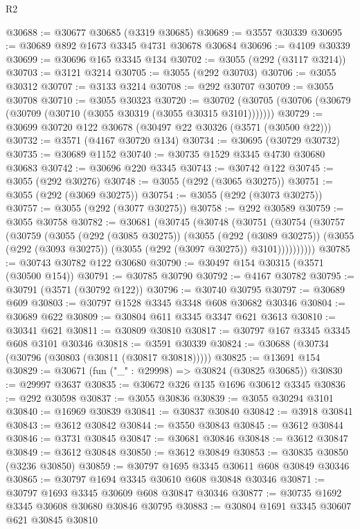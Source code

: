 \begin{lexlean}{R2}
\begin{coremodule}
@30688 := @30677 @30685 (@3319 @30685)
@30689 := @3557 @30339
@30695 := @30689 @892 @1673 @3345 @4731 @30678 @30684
@30696 := @4109 @30339
@30699 := @30696 @165 @3345 @134
@30702 := @3055 (@292 (@3117 @3214))
@30703 := @3121 @3214
@30705 := @3055 (@292 @30703)
@30706 := @3055 @30312
@30707 := @3133 @3214
@30708 := @292 @30707
@30709 := @3055 @30708
@30710 := @3055 @30323
@30720 := @30702 (@30705 (@30706 (@30679 (@30709 (@30710 (@3055 @30319 (@3055 @30315 @3101)))))))
@30729 := @30699 @30720 @122 @30678 (@30497 @22 @30326 (@3571 (@30500 @22)))
@30732 := @3571 (@4167 @30720 @134)
@30734 := @30695 (@30729 @30732)
@30735 := @30689 @1152
@30740 := @30735 @1529 @3345 @4730 @30680 @30683
@30742 := @30696 @220 @3345
@30743 := @30742 @122
@30745 := @3055 (@292 @30276)
@30748 := @3055 (@292 (@3065 @30275))
@30751 := @3055 (@292 (@3069 @30275))
@30754 := @3055 (@292 (@3073 @30275))
@30757 := @3055 (@292 (@3077 @30275))
@30758 := @292 @30589
@30759 := @3055 @30758
@30782 := @30681
    (@30745
      (@30748
        (@30751
          (@30754
            (@30757
              (@30759
                (@3055
                  (@292 (@3085 @30275))
                  (@3055
                    (@292 (@3089 @30275))
                    (@3055 (@292 (@3093 @30275)) (@3055 (@292 (@3097 @30275)) @3101))))))))))
@30785 := @30743 @30782 @122 @30680
@30790 := @30497 @154 @30315 (@3571 (@30500 @154))
@30791 := @30785 @30790
@30792 := @4167 @30782
@30795 := @30791 (@3571 (@30792 @122))
@30796 := @30740 @30795
@30797 := @30689 @609
@30803 := @30797 @1528 @3345 @3348 @608 @30682 @30346
@30804 := @30689 @622
@30809 := @30804 @611 @3345 @3347 @621 @3613
@30810 := @30341 @621
@30811 := @30809 @30810
@30817 := @30797 @167 @3345 @3345 @608 @3101 @30346
@30818 := @3591 @30339
@30824 := @30688 (@30734 (@30796 (@30803 (@30811 (@30817 @30818)))))
@30825 := @13691 @154
@30829 := @30671 (fun ("_" : @29998) => @30824 (@30825 @30685))
@30830 := @29997 @3637
@30835 := @30672 @326 @135 @1696 @30612 @3345
@30836 := @292 @30598
@30837 := @3055 @30836
@30839 := @3055 @30294 @3101
@30840 := @16969 @30839
@30841 := @30837 @30840
@30842 := @3918 @30841
@30843 := @3612 @30842
@30844 := @3550 @30843
@30845 := @3612 @30844
@30846 := @3731 @30845
@30847 := @30681 @30846
@30848 := @3612 @30847
@30849 := @3612 @30848
@30850 := @3612 @30849
@30853 := @30835 @30850 (@3236 @30850)
@30859 := @30797 @1695 @3345 @30611 @608 @30849 @30346
@30865 := @30797 @1694 @3345 @30610 @608 @30848 @30346
@30871 := @30797 @1693 @3345 @30609 @608 @30847 @30346
@30877 := @30735 @1692 @3345 @30608 @30680 @30846 @30795
@30883 := @30804 @1691 @3345 @30607 @621 @30845 @30810

\end{coremodule}
\end{lexlean}
